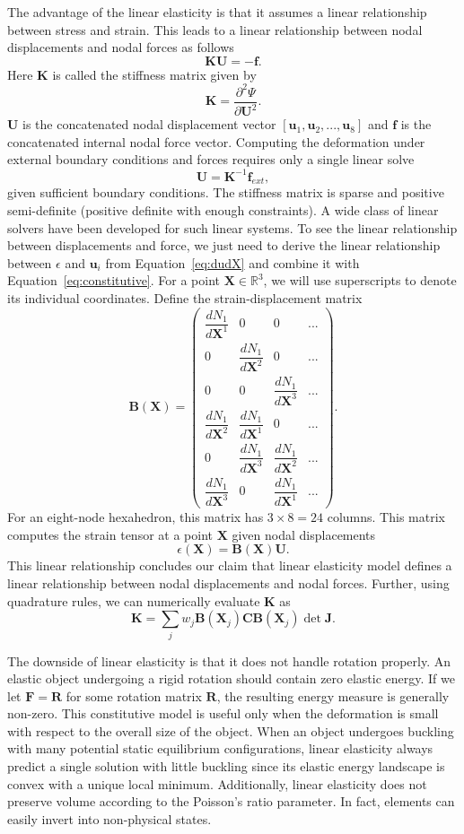 The advantage of the linear elasticity is that it assumes a linear relationship between stress and strain. This leads to a linear relationship between nodal displacements and nodal forces
as follows
\[
\mathbf{K}\mathbf{U}=-\mathbf{f}.
\]
Here $\mathbf{K}$ is called the stiffness matrix given by
\[
\mathbf{K}=\frac{\partial^2 \Psi}{\partial\mathbf{U}^2}.
\]
$\mathbf{U}$ is the concatenated nodal displacement vector
$[\mathbf{u}_1,\mathbf{u}_2,...,\mathbf{u}_8]$ and $\mathbf{f}$ is the concatenated internal nodal force vector.
Computing the deformation under external boundary conditions and forces requires only a single linear solve
\[
\mathbf{U}=\mathbf{K}^{-1}\mathbf{f}_{ext},
\]
given sufficient boundary conditions.
The stiffness matrix is sparse and positive semi-definite (positive definite with enough constraints).
A wide class of linear solvers have been developed for such linear systems.
To see the linear relationship between displacements and force,
we just need to derive the linear relationship between $\epsilon$ and $\mathbf{u}_i$
from Equation~\ref{eq:dudX} and combine it with Equation~\ref{eq:constitutive}.
For a point $\mathbf{X}\in\mathbb{R}^3$, we will use superscripts to denote its individual coordinates.
Define the strain-displacement matrix
\[
\mathbf{B}(\mathbf{X})=
\begin{pmatrix}
\dfrac{dN_1}{d\mathbf{X}^1} & 0 & 0 & ... \\
0 & \dfrac{dN_1}{d\mathbf{X}^2} & 0 & ... \\
0 & 0 & \dfrac{dN_1}{d\mathbf{X}^3} & ... \\
\dfrac{dN_1}{d\mathbf{X}^2} & \dfrac{dN_1}{d\mathbf{X}^1} & 0 & ... \\
0 & \dfrac{dN_1}{d\mathbf{X}^3} & \dfrac{dN_1}{d\mathbf{X}^2} & ... \\
\dfrac{dN_1}{d\mathbf{X}^3} & 0 & \dfrac{dN_1}{d\mathbf{X}^1} & ...
\end{pmatrix}.
\]
For an eight-node hexahedron, this matrix has $3\times 8=24$ columns.
This matrix computes the strain tensor at a point $\mathbf{X}$ given nodal displacements
\[
\epsilon(\mathbf{X})=\mathbf{B}(\mathbf{X})\mathbf{U}.
\]
This linear relationship concludes our claim that linear elasticity model defines a linear relationship between nodal displacements and nodal forces.
Further, using quadrature rules, we can numerically evaluate $\mathbf{K}$ as
\[
\mathbf{K}=\sum_j w_j \mathbf{B}(\mathbf{X}_j)\mathbf{C}\mathbf{B}(\mathbf{X}_j)\det \mathbf{J}.
\]

The downside of linear elasticity is that it does not handle rotation properly.
An elastic object undergoing a rigid rotation should contain zero elastic energy.
If we let $\mathbf{F}=\mathbf{R}$ for some rotation matrix $\mathbf{R}$,
the resulting energy measure is generally non-zero.
This constitutive model is useful only when the deformation is small with respect to the overall size of the object.
When an object undergoes buckling with many potential static equilibrium configurations,
linear elasticity always predict a single solution with little buckling since its elastic energy landscape is convex with a unique local minimum.
Additionally, linear elasticity does not preserve volume according to the Poisson's ratio parameter. In fact, elements can easily invert into non-physical states.

